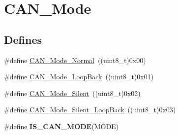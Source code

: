 \hypertarget{group__CAN__Mode}{
\section{CAN\_\-Mode}
\label{group__CAN__Mode}
}
\subsection*{Defines}
\begin{DoxyCompactItemize}
\item 
\#define \hyperlink{group__CAN__Mode_gaaf1f48ab4917ccfd5fd31dd781d59e29}{CAN\_\-Mode\_\-Normal}~((uint8\_\-t)0x00)
\item 
\#define \hyperlink{group__CAN__Mode_gaad036c944403186eb3496ff65020c0ee}{CAN\_\-Mode\_\-LoopBack}~((uint8\_\-t)0x01)
\item 
\#define \hyperlink{group__CAN__Mode_gac05e5d666f18eb35e8da70e6e17e8fb8}{CAN\_\-Mode\_\-Silent}~((uint8\_\-t)0x02)
\item 
\#define \hyperlink{group__CAN__Mode_ga087afa0d24d2cf399225993573c984eb}{CAN\_\-Mode\_\-Silent\_\-LoopBack}~((uint8\_\-t)0x03)
\item 
\#define {\bfseries IS\_\-CAN\_\-MODE}(MODE)
\end{DoxyCompactItemize}


